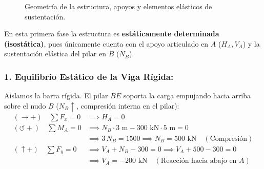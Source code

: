 \begin{figure}[H]
{%
    }
    \caption{Geometría de la estructura, apoyos y elementos elásticos de sustentación.}
    \label{fig:examen_nov_tirantes_geometria}
\end{figure}


En esta primera fase la estructura es \textbf{estáticamente determinada (isostática)}, pues únicamente cuenta con el apoyo articulado en $A$ ($H_A, V_A$) y la sustentación elástica del pilar en $B$ ($N_B$).

\subsubsection*{1. Equilibrio Estático de la Viga Rígida:}
Aislamos la barra rígida. El pilar $BE$ soporta la carga empujando hacia arriba sobre el nudo $B$ ($N_B \uparrow$, compresión interna en el pilar):
\begin{align}
    (\rightarrow +) \quad \sum F_x = 0      & \implies \boxed{H_A = 0} \\[6pt]
    (\circlearrowleft +) \quad \sum M_A = 0 & \implies N_B \cdot 3\text{ m} - 300\text{ kN} \cdot 5\text{ m} = 0 \nonumber \\
                                            & \implies 3\,N_B = 1500 \implies \boxed{N_B = 500\text{ kN} \quad (\text{Compresión})} \\[6pt]
    (\uparrow +) \quad \sum F_y = 0         & \implies V_A + N_B - 300 = 0 \implies V_A + 500 - 300 = 0 \nonumber \\
                                            & \implies \boxed{V_A = -200\text{ kN}} \quad (\text{Reacción hacia abajo en } A)
\end{align}

